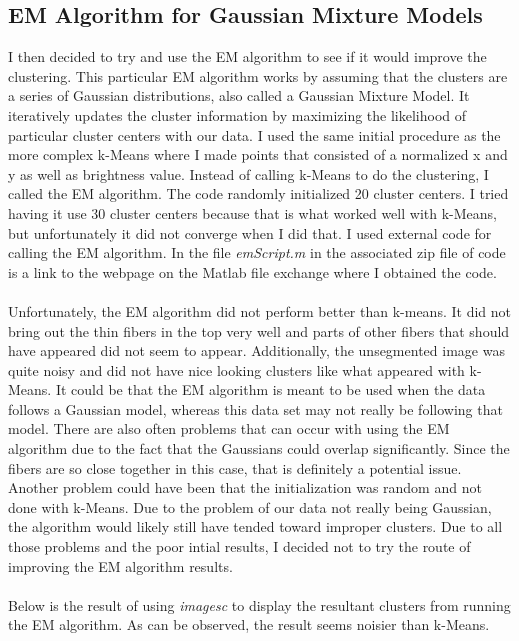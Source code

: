 \documentclass[11pt,psfig]{article}
\begin{document}
\subsection{EM Algorithm for Gaussian Mixture Models}
I then decided to try and use the EM algorithm to see if it would improve the clustering. This particular EM algorithm works by assuming that the clusters are a series of Gaussian distributions, also called a Gaussian Mixture Model. It iteratively updates the cluster information by maximizing the likelihood of particular cluster centers with our data. I used the same initial procedure as the more complex k-Means where I made points that consisted of a normalized x and y as well as brightness value. Instead of calling k-Means to do the clustering, I called the EM algorithm. The code randomly initialized 20 cluster centers. I tried having it use 30 cluster centers because that is what worked well with k-Means, but unfortunately it did not converge when I did that. I used external code for calling the EM algorithm. In the file \textit{emScript.m} in the associated zip file of code is a link to the webpage on the Matlab file exchange where I obtained the code. \\
\\
Unfortunately, the EM algorithm did not perform better than k-means. It did not bring out the thin fibers in the top very well and parts of other fibers that should have appeared did not seem to appear. Additionally, the unsegmented image was quite noisy and did not have nice looking clusters like what appeared with k-Means. It could be that the EM algorithm is meant to be used when the data follows a Gaussian model, whereas this data set may not really be following that model. There are also often problems that can occur with using the EM algorithm due to the fact that the Gaussians could overlap significantly. Since the fibers are so close together in this case, that is definitely a potential issue. Another problem could have been that the initialization was random and not done with k-Means. Due to the problem of our data not really being Gaussian, the algorithm would likely still have tended toward improper clusters. Due to all those problems and the poor intial results, I decided not to try the route of improving the EM algorithm results. \\
\\
Below is the result of using \textit{imagesc} to display the resultant clusters from running the EM algorithm. As can be observed, the result seems noisier than k-Means.
\end{document}
